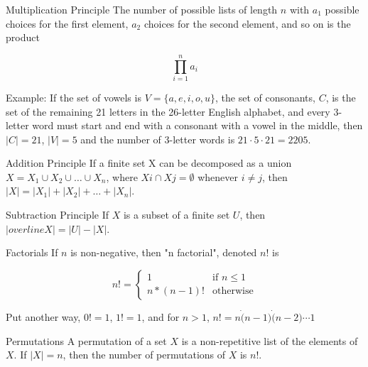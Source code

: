 \documentclass[smaller]{beamer}
\begin{document}
\begin{frame}[label={sec:org3fc185e}]{Multiplication Principle}
The number of possible lists of length \(n\) with \(a_1\) possible choices for the first element, \(a_2\) choices for the second element, and so on is the product

$$
\prod_{i = 1}^{n} a_i
$$

\begin{block}{Example:}
If the set of vowels is \(V = \{a, e, i, o, u\}\), the set of consonants, \(C\), is the set of the remaining 21 letters in the 26-letter English alphabet, and every 3-letter word must start and end with a consonant with a vowel in the middle, then \(|C| = 21\), \(|V| = 5\) and the number of 3-letter words is \(21 \cdot 5 \cdot 21 = 2205\).
\end{block}
\end{frame}

\begin{frame}[label={sec:orgd193c68}]{Addition Principle}
If a finite set X can be decomposed as a union \(X = X_1 \cup X_2 \cup \dots \cup X_n\), where \(Xi \cap Xj = \emptyset\) whenever \(i \ne j\), then \(|X| = |X_1| + |X_2| + \dots + |X_n|\).
\end{frame}

\begin{frame}[label={sec:org2ba5901}]{Subtraction Principle}
If \(X\) is a subset of a finite set \(U\), then \(|overline{X}| = |U| - |X|\).
\end{frame}

\begin{frame}[label={sec:orgf94f3c1}]{Factorials}
If \(n\) is non-negative, then "n factorial", denoted \(n!\) is

\begin{equation*}
      n! = \begin{cases}
               1                 & \text{if } n \le 1\\
               n * (n-1)!        & \text{otherwise}
           \end{cases}
\end{equation*}

Put another way, \(0! = 1\), \(1! = 1\), and for \(n > 1\), \(n! = n \dot (n - 1) \dot (n - 2) \cdots 1\)
\end{frame}

\begin{frame}[label={sec:org46a199e}]{Permutations}
A permutation of a set \(X\) is a non-repetitive list of the elements of \(X\).  If \(|X| = n\), then the number of permutations of \(X\) is \(n!\).
\end{frame}
\end{document}
